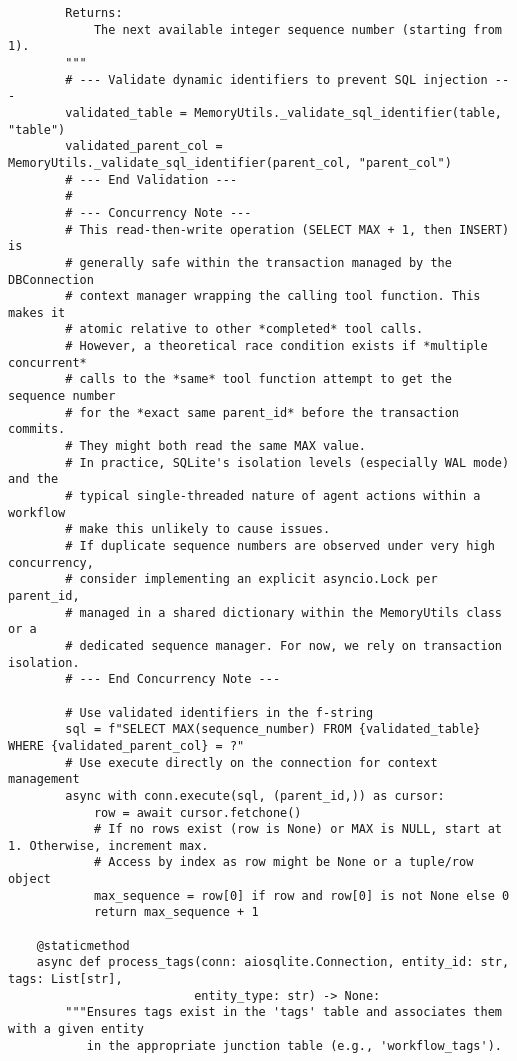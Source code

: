 \documentclass[12pt,a4paper]{article}
\begin{document}
\begin{pageablecode}
\begin{verbatim}
        Returns:
            The next available integer sequence number (starting from 1).
        """
        # --- Validate dynamic identifiers to prevent SQL injection ---
        validated_table = MemoryUtils._validate_sql_identifier(table, "table")
        validated_parent_col = MemoryUtils._validate_sql_identifier(parent_col, "parent_col")
        # --- End Validation ---
        #         
        # --- Concurrency Note ---
        # This read-then-write operation (SELECT MAX + 1, then INSERT) is
        # generally safe within the transaction managed by the DBConnection
        # context manager wrapping the calling tool function. This makes it
        # atomic relative to other *completed* tool calls.
        # However, a theoretical race condition exists if *multiple concurrent*
        # calls to the *same* tool function attempt to get the sequence number
        # for the *exact same parent_id* before the transaction commits.
        # They might both read the same MAX value.
        # In practice, SQLite's isolation levels (especially WAL mode) and the
        # typical single-threaded nature of agent actions within a workflow
        # make this unlikely to cause issues.
        # If duplicate sequence numbers are observed under very high concurrency,
        # consider implementing an explicit asyncio.Lock per parent_id,
        # managed in a shared dictionary within the MemoryUtils class or a
        # dedicated sequence manager. For now, we rely on transaction isolation.
        # --- End Concurrency Note ---

        # Use validated identifiers in the f-string
        sql = f"SELECT MAX(sequence_number) FROM {validated_table} WHERE {validated_parent_col} = ?"
        # Use execute directly on the connection for context management
        async with conn.execute(sql, (parent_id,)) as cursor:
            row = await cursor.fetchone()
            # If no rows exist (row is None) or MAX is NULL, start at 1. Otherwise, increment max.
            # Access by index as row might be None or a tuple/row object
            max_sequence = row[0] if row and row[0] is not None else 0
            return max_sequence + 1

    @staticmethod
    async def process_tags(conn: aiosqlite.Connection, entity_id: str, tags: List[str],
                          entity_type: str) -> None:
        """Ensures tags exist in the 'tags' table and associates them with a given entity
           in the appropriate junction table (e.g., 'workflow_tags').


\end{verbatim}
\end{pageablecode}
\end{document}
